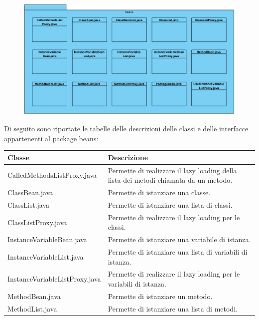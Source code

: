 \documentclass[11pt]{article}
\begin{document}
				\begin{description}
			\newpage
					\item[ 2.1.5.1 Package beans]
					\item \begin{figure}[!h]
						\centering
						\includegraphics[width=15.5cm]{diagrams/BeansPackageDiagram}
					\end{figure}
					Di seguito sono riportate le tabelle delle descrizioni delle classi e delle interfacce appartenenti al package beans:
					\item \begin{tabular}{|p{}|p{}|}
						\hline
						\textbf{Classe} & \textbf{Descrizione}\\
						\hline
						CalledMethodsListProxy.java & Permette di realizzare il lazy loading della lista dei metodi chiamata da un metodo. \\
						\hline
						ClassBean.java & Permette di istanziare una classe. \\
						\hline
						ClassList.java & Permette di istanziare una lista di classi. \\
						\hline
						ClassListProxy.java & Permette di realizzare il lazy loading per le classi. \\
						\hline
						InstanceVariableBean.java & Permette di istanziare una variabile di istanza. \\
						\hline
						InstanceVariableList.java & Permette di istanziare una lista di variabili di istanza. \\
						\hline
						InstanceVariableListProxy.java & Permette di realizzare il lazy loading per le variabili di istanza. \\
						\hline
						MethodBean.java & Permette di istanziare un metodo. \\
						\hline
						MethodList.java & Permette di istanziare una lista di metodi. \\

\end{tabular}
\end{description}
\end{document}
